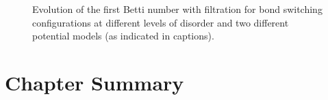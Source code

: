 \begin{figure}[tb]
	\caption{Evolution of the first Betti number with filtration for bond switching configurations at different levels of disorder and two different potential models (as indicated in captions).}
	\label{fig:bsbetti}
\end{figure}

\section{Chapter Summary}
